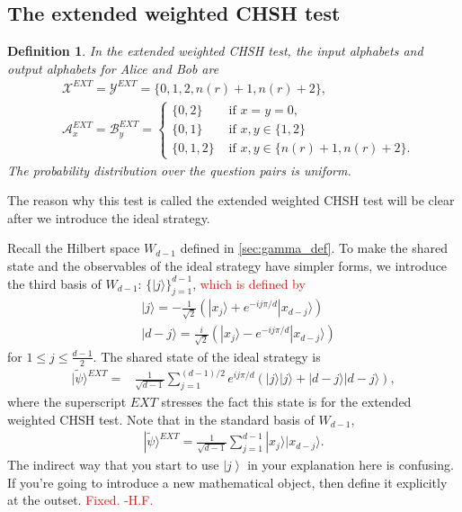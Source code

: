 \documentclass[11pt,letterpaper]{article}
\newcommand{\ket}[1]{|#1\rangle}
\newcommand{\calX}{\mathcal{X}}
\newcommand{\calY}{\mathcal{Y}}
\newcommand{\calA}{\mathcal{A}}
\newcommand{\calB}{\mathcal{B}}
\newcommand{\1}{\mathbb{1}}
\newcommand{\EXT}{EXT}
\newcommand{\tpsi}{\tilde{\psi}}
\newcommand{\nr}{n(r)}
\def\carl#1{{\color{blue} #1}}
\newcommand{\hf}[1]{\textcolor{red}{#1}}
\newcommand{\hfc}[1]{\textcolor{red}{#1 -H.F.}}
\newtheorem{definition}[theorem]{Definition}
\theoremstyle{definition}
\begin{document}
\subsection{The extended weighted CHSH test}
\label{sec:ext_w_chsh}
\begin{definition}
    \label{def:ext_w_chsh}
    In the extended weighted CHSH test, the input alphabets and output alphabets for Alice and Bob are
    \begin{align*}
        &\calX^{\EXT} = \calY^{\EXT} = \{0, 1, 2, \nr+1, \nr+2\}, \\
        &\calA_x^{\EXT} = \calB_y^{\EXT} =
        \begin{cases}
            \{0,2\} &\text{ if } x = y = 0, \\
            \{0,1\} &\text{ if } x,y \in \{1, 2\} \\
            \{0,1,2\} &\text{ if } x,y \in \{\nr+1, \nr+2\}. 
        \end{cases}
    \end{align*}
    The probability distribution over the question pairs is uniform.
\end{definition}
The reason why this test is called the extended weighted CHSH test will be clear 
after we introduce the ideal strategy.

Recall the Hilbert space $W_{d-1}$ defined in \cref{sec:gamma_def}. 
To make the shared state and the observables of the ideal strategy have
simpler forms, we introduce the third basis of $W_{d-1}$: $\{ \ket{j} \}_{j=1}^{d-1}$, \hf{which is defined by}
\begin{align*}
    &\ket{j} = -\frac{1}{\sqrt{2}}(\ket{x_j} + e^{-ij\pi/d}\ket{x_{d-j}}) \\
    &\ket{d-j} = \frac{i}{\sqrt{2}}(\ket{x_j} - e^{-ij\pi/d}\ket{x_{d-j}})
\end{align*}
for $1 \leq j \leq \frac{d-1}{2}$.
The shared state of the ideal strategy is 
\begin{equation}
    \label{eq:tpsi}
    \begin{aligned}
        \ket{\tpsi}^{\EXT}
         =& \frac{1}{\sqrt{d-1}} \sum_{j=1}^{(d-1)/2} e^{ij\pi/d}(\ket{j}\ket{j} + \ket{d-j}\ket{d-j}),
    \end{aligned}
\end{equation}
where the superscript $\EXT$ stresses the fact this state is for the extended weighted CHSH test.
Note that in the standard basis of $W_{d-1}$,
\begin{align*}
    \ket{\tpsi}^{\EXT} = \frac{1}{\sqrt{d-1}} \sum_{j=1}^{d-1} \ket{x_j}\ket{x_{d-j}}.
\end{align*}
\carl{The indirect way that you start to use $\left| j \right>$ in your explanation here is confusing.  If you're going to introduce a new mathematical object, then define it explicitly at the outset.}
\hfc{Fixed.}
\end{document}
